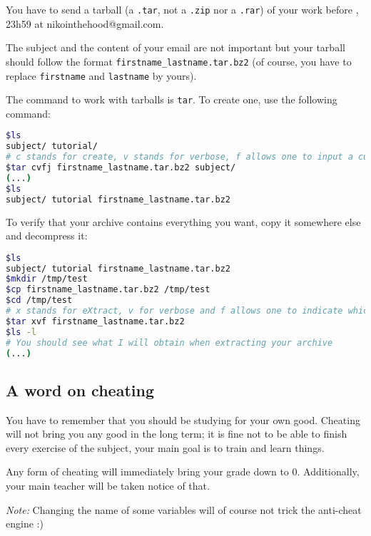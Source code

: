 \documentclass[12pt]{article}
\begin{document}
You have to send a tarball (a \texttt{.tar}, not a \texttt{.zip} nor a \texttt{.rar}) of your work before , 23h59 at nikointhehood@gmail.com.

The subject and the content of your email are not important but your tarball should follow the format \texttt{firstname\_lastname.tar.bz2} (of course, you have to replace \texttt{firstname} and \texttt{lastname} by yours).

The command to work with tarballs is \texttt{tar}. To create one, use the following command:

\begin{lstlisting}[language=bash]
$ls
subject/ tutorial/
# c stands for create, v stands for verbose, f allows one to input a custom name for the archive and j indicates the usage of bzip2
$tar cvfj firstname_lastname.tar.bz2 subject/
(...)
$ls
subject/ tutorial firstname_lastname.tar.bz2
\end{lstlisting}

To verify that your archive contains everything you want, copy it somewhere else and decompress it:

\begin{lstlisting}[language=bash]
$ls
subject/ tutorial firstname_lastname.tar.bz2
$mkdir /tmp/test
$cp firstname_lastname.tar.bz2 /tmp/test
$cd /tmp/test
# x stands for eXtract, v for verbose and f allows one to indicate which file tar should work with
$tar xvf firstname_lastname.tar.bz2
$ls -l
# You should see what I will obtain when extracting your archive
(...)
\end{lstlisting}

\subsection{A word on cheating}

You have to remember that you should be studying for your own good. Cheating will not bring you any good in the long term; it is fine not to be able to finish every exercise of the subject, your main goal is to train and learn things.

Any form of cheating will immediately bring your grade down to 0. Additionally, your main teacher will be taken notice of that.

\textit{Note:} Changing the name of some variables will of course not trick the anti-cheat engine :)
\end{document}

